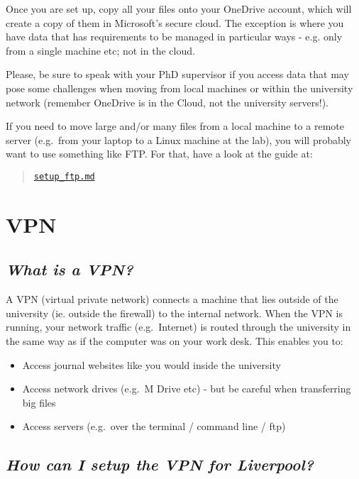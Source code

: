 \documentclass[
]{book}
\providecommand{\tightlist}{%
  \setlength{\itemsep}{0pt}\setlength{\parskip}{0pt}}
\begin{document}
Once you are set up, copy all your files onto your OneDrive account, which
will create a copy of them in Microsoft's secure cloud. The exception is
where you have data that has requirements to be managed in particular ways - e.g.
only from a single machine etc; not in the cloud.

Please, be sure to speak with your PhD supervisor if you access data that
may pose some challenges when moving from local machines or within the university
network (remember OneDrive is in the Cloud, not the university servers!).

If you need to move large and/or many files from a local machine to a remote
server (e.g.~from your laptop to a Linux machine at the lab), you will
probably want to use something like FTP. For that, have a look at the guide
at:

\begin{quote}
\href{setup_ftp.md}{\texttt{setup\_ftp.md}}
\end{quote}

\hypertarget{vpn}{%
\chapter{VPN}\label{vpn}}

\hypertarget{what-is-a-vpn}{%
\section{\texorpdfstring{\emph{What is a VPN?}}{What is a VPN?}}\label{what-is-a-vpn}}

A VPN (virtual private network) connects a machine that lies outside of the university (ie. outside the firewall) to the internal network. When the VPN is running, your network traffic (e.g.~Internet) is routed through the university in the same way as if the computer was on your work desk. This enables you to:

\begin{itemize}
\tightlist
\item
  Access journal websites like you would inside the university
\item
  Access network drives (e.g.~M Drive etc) - but be careful when transferring big files
\item
  Access servers (e.g.~over the terminal / command line / ftp)
\end{itemize}

\hypertarget{how-can-i-setup-the-vpn-for-liverpool}{%
\section{\texorpdfstring{\emph{How can I setup the VPN for Liverpool?}}{How can I setup the VPN for Liverpool?}}\label{how-can-i-setup-the-vpn-for-liverpool}}
\end{document}
